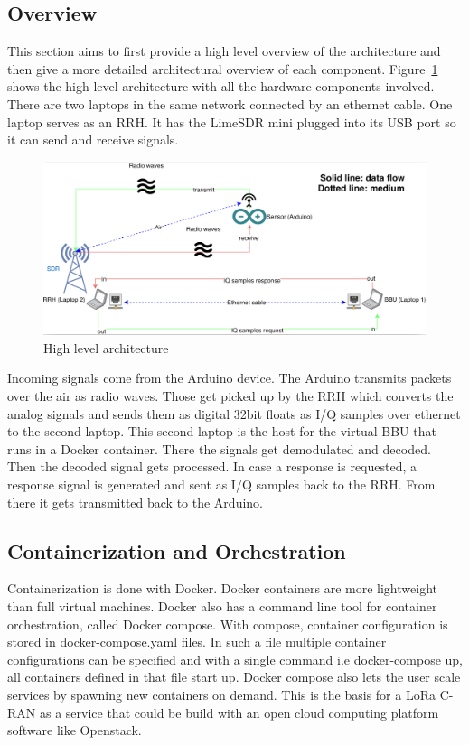 \subsection{Overview}
This section aims to first provide a high level overview of the architecture and then give a more detailed 
architectural overview of each component.
Figure~\ref{fig:high_level_arch} shows the high level architecture with all the hardware components involved.
There are two laptops in the same network connected by an ethernet cable. One laptop serves as an RRH. It has the LimeSDR mini 
plugged into its USB port so it can send and receive signals.
\begin{figure}[h]
    \centering
    \includegraphics[width=1\textwidth]{figures/high_level_arch.png}
    \caption{High level architecture}
    \label{fig:high_level_arch}
\end{figure}
Incoming signals come from the Arduino device. The Arduino transmits packets over the air as radio waves. Those get picked up 
by the RRH which converts the analog signals and sends them as digital 32bit floats as I/Q samples over ethernet to the second laptop.
This second laptop is the host for the virtual BBU that runs in a Docker container. There the signals get demodulated and decoded.
Then the decoded signal gets processed. In case a response is requested, a response signal is generated and sent as I/Q samples back to the RRH.
From there it gets transmitted back to the Arduino.
\subsection{Containerization and Orchestration}
Containerization is done with Docker. Docker containers are more lightweight than full virtual machines.
Docker also has a command line tool for container orchestration, called Docker compose. With compose, container configuration is stored in docker-compose.yaml files.
In such a file multiple container configurations can be specified and with a single command i.e docker-compose up, all containers defined in that file start up.
Docker compose also lets the user scale services by spawning new containers on demand.
This is the basis for a LoRa C-RAN as a service that could be build with an open cloud computing platform software like Openstack.
